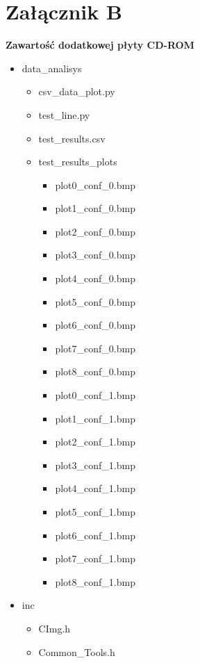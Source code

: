 \documentclass[document.tex]{subfiles}
\begin{document}
\chapter*{Załącznik B}

\textbf{\Large{Zawartość dodatkowej płyty CD-ROM}}

\begin{itemize}
    \item data\_analisys
    \begin{itemize}
        \item csv\_data\_plot.py
        \item test\_line.py
        \item test\_results.csv
        \item test\_results\_plots
        \begin{itemize}
            \item plot0\_conf\_0.bmp
            \item plot1\_conf\_0.bmp
            \item plot2\_conf\_0.bmp
            \item plot3\_conf\_0.bmp
            \item plot4\_conf\_0.bmp
            \item plot5\_conf\_0.bmp
            \item plot6\_conf\_0.bmp
            \item plot7\_conf\_0.bmp
            \item plot8\_conf\_0.bmp
            \item plot0\_conf\_1.bmp
            \item plot1\_conf\_1.bmp
            \item plot2\_conf\_1.bmp
            \item plot3\_conf\_1.bmp
            \item plot4\_conf\_1.bmp
            \item plot5\_conf\_1.bmp
            \item plot6\_conf\_1.bmp
            \item plot7\_conf\_1.bmp
            \item plot8\_conf\_1.bmp
        \end{itemize}
    \end{itemize}
    \item inc
    \begin{itemize}
        \item CImg.h
        \item Common\_Tools.h

\end{itemize}
\end{itemize}
\end{document}
